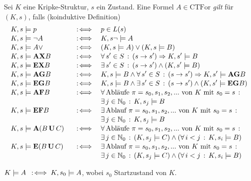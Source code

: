 \documentclass{cheat-sheet}
\newcommand{\CTFor}{\mathrm{CTFor}} %
\newcommand{\U}{\,\mathbf{U}\,} %
\newcommand{\A}{\mathbf{A}}
\newcommand{\E}{\mathbf{E}}
\newcommand{\AG}{\mathbf{AG}}
\newcommand{\EG}{\mathbf{EG}}
\newcommand{\AF}{\mathbf{AF}}
\newcommand{\EF}{\mathbf{EF}}
\newcommand{\AX}{\mathbf{AX}}
\newcommand{\EX}{\mathbf{EX}}
\begin{document}
\begin{samepage}
\begin{defn}
  Sei $K$ eine Kripke-Struktur, $s$ ein Zustand. Eine Formel $A \in \CTFor$ \emph{gilt} für $(K, s)$, falls (koinduktive Definition)
  \begin{alignat*}{3}
    & K, s \models p &&\coloniff&& p \in L(s)\\[-2pt]
    & K, s \models \neg A &&\coloniff&& K, s \neg\models A\\[-2pt]
    & K, s \models A \vee &&\coloniff&& (K, s \models A) \vee (K, s \models B)\\[-2pt]
    & K, s \models \AX B &&\coloniff&& \fa{s' \in S} (s \to s') \Rightarrow K, s' \models B\\[-2pt]
    & K, s \models \EX B &&\coloniff&& \ex{s' \in S} (s \to s') \wedge (K, s' \models B)\\[-2pt]
    & K, s \models \AG B &&\coloniff&& K, s \models B \wedge \fa{s' \in S} (s \to s') \Rightarrow K, s' \models \AG B\\[-2pt]
    & K, s \models \EG B &&\coloniff&& K, s \models B \wedge \ex{s' \in S} (s \to s') \wedge (K, s' \models \EG B)\\[-2pt]
    & K, s \models \AF B &&\coloniff&& \fa{\text{Abläufe $\pi = s_0, s_1, s_2, ...$ von $K$ mit $s_0 = s$}} \\[-2pt]
      & && && \ex{j \in \N_0} K, s_j \models B \\[-2pt]
    & K, s \models \EF B &&\coloniff&& \ex{\text{Ablauf $\pi = s_0, s_1, s_2, ...$ von $K$ mit $s_0 = s$}} \\[-2pt]
      & && && \ex{j \in \N_0} K, s_j \models B \\[-2pt]
    & K, s \models \A (B \U C) &&\coloniff&& \fa{\text{Abläufe $\pi = s_0, s_1, s_2, ...$ von $K$ mit $s_0 = s$}} \\[-2pt]
    & && && \ex{j \in \N_0} (K, s_j \models C) \wedge (\fa{i < j} K, s_i \models B)\\[-2pt]
    & K, s \models \E (B \U C) &&\coloniff&& \ex{\text{Ablauf $\pi = s_0, s_1, s_2, ...$ von $K$ mit $s_0 = s$}} \\[-2pt]
    & && && \ex{j \in \N_0} (K, s_j \models C) \wedge (\fa{i < j} K, s_i \models B)
  \end{alignat*}
\end{defn}
  
\end{samepage}

\begin{nota}
  $K \models A \enspace:\!\iff K, s_0 \models A$, wobei $s_0$ Startzustand von $K$.
\end{nota}
\end{document}
